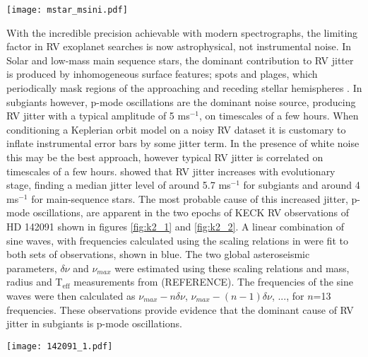 \documentclass[useAMS, usenatbib]{aastex}
\begin{document}
\begin{figure*}
\begin{center}
\texttt{[image: mstar\_msini.pdf]}
\caption{Host star mass vs minimum masses for planets with orbital solutions
listed in the {\it Exoplanet.org}. In this study we are targeting the blue
region.}
\label{fig:mstar_msini}
\end{center}
\end{figure*}

With the incredible precision achievable with modern spectrographs, the
limiting factor in RV exoplanet searches is now astrophysical, not
instrumental noise.
In Solar and low-mass main sequence stars, the dominant contribution to RV
jitter is produced by inhomogeneous surface features; spots and plages, which
periodically mask regions of the approaching and receding stellar hemispheres \citep{Aigrain2012, Dumusque2011, Haywood2014}.
In subgiants however, p-mode oscillations are the dominant noise
source, producing RV jitter with a typical amplitude of 5 ms$^{-1}$, on
timescales of a few hours.
When conditioning a Keplerian orbit model on a noisy RV dataset it is
customary to inflate instrumental error bars by some jitter term. In the
presence of white noise this may be the best approach, however typical RV
jitter is correlated on timescales of a few hours.
\citep{Wright2005} showed that RV jitter increases with evolutionary stage,
finding a median jitter level of around 5.7 ms$^{-1}$ for subgiants and around
4 ms$^{-1}$ for main-sequence stars.
The most probable cause of this increased jitter, p-mode oscillations,
are apparent in the two epochs of KECK RV observations of
HD 142091 shown in figures \ref{fig:k2_1} and \ref{fig:k2_2}.
A linear combination of sine waves, with frequencies calculated using the
scaling relations in \citep{Kjeldsen1995} were fit to both sets of
observations, shown in blue.
The two global asteroseismic parameters, $\delta \nu$ and $\nu_{max}$ were
estimated using these scaling relations and mass, radius and T$_{\mathrm{eff}}$ measurements from (REFERENCE).
The frequencies of the sine waves were then calculated as $\nu_{max}-n\delta
\nu$, $\nu_{max}-(n-1)\delta \nu$, ..., for $n$=13 frequencies.
These observations provide evidence that the dominant cause of RV jitter in
subgiants is p-mode oscillations.

\begin{figure*}
\begin{center}
\texttt{[image: 142091\_1.pdf]}
\caption{KECK RV observations of HD 142091. A fit to the data using a linear
combination of 13 theoretical oscillation frequencies is shown in blue. The RMS
of the residuals is 1.36 ms$^{-1}$.}
\label{fig:k2_1}
\end{center}
\end{figure*}
\end{document}
